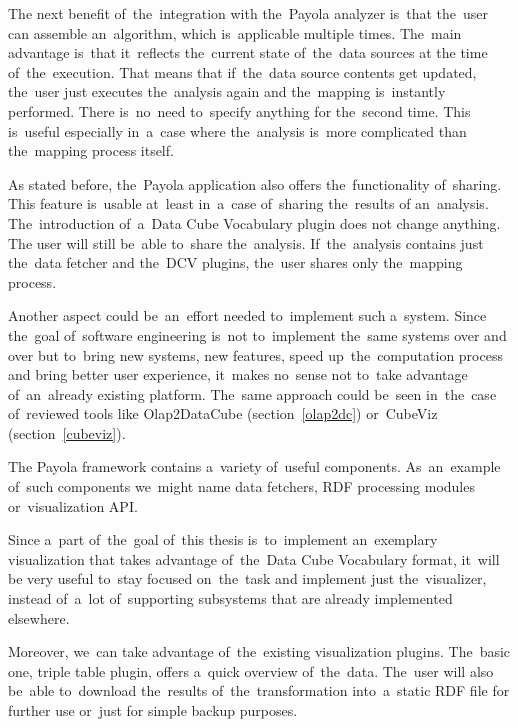 The next benefit of~the~integration with the~Payola analyzer is~that the~user 
can assemble an~algorithm, which is~applicable multiple times. The~main 
advantage is~that it~reflects the~current state of~the~data sources at
the time of~the~execution. That means that if~the~data source contents get 
updated, the~user just executes the~analysis again and the~mapping is~instantly 
performed. There is~no~need to~specify anything for the~second time.
This is~useful especially in~a~case where the~analysis is~more complicated than the~mapping process itself.

As stated before, the~Payola application also offers the~functionality of~sharing. This feature is~usable at~least in~a~case of~sharing the~results 
of an~analysis. The~introduction of~a~Data Cube Vocabulary plugin does not change anything.
The user will still be~able to~share the~analysis. If~the~analysis contains just the~data fetcher 
and the~DCV plugins, the~user shares only the~mapping process.

Another aspect could be~an~effort needed to~implement such a~system. Since the~goal of~software engineering is~not to~implement the~same systems over and over 
but to~bring new systems, new features, speed up~the~computation process and 
bring better user experience, it~makes no~sense not to~take advantage of~an~already existing platform. The~same approach could be~seen in~the~case of~reviewed 
tools like Olap2DataCube (section~\ref{olap2dc}) or~CubeViz 
(section~\ref{cubeviz}).

The Payola framework contains a~variety of~useful components. As~an~example of~such components we~might name data fetchers, RDF processing modules or~visualization API.

Since a~part of~the~goal of~this thesis is~to~implement an~exemplary 
visualization that takes advantage of~the~Data Cube Vocabulary format, it~will 
be very useful to~stay focused on~the~task and implement just the~visualizer, 
instead of~a~lot of~supporting subsystems that are already 
implemented elsewhere.

Moreover, we~can take advantage of~the~existing visualization plugins. The~basic 
one, triple table plugin, offers a~quick overview of~the~data. The~user 
will also be~able to~download the~results of~the~transformation into~a~static 
RDF file for further use or~just for simple backup purposes.

